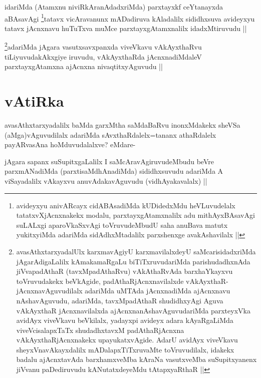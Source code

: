 
\begin{artha}
idariMda (Atamxnu niviRkAranAdadxriMda) parxtayxkf ceYtanayxda aBAsavAgi \footnote{avideyxyu anivARcayx cidABAsadiMda kUDidedxMdu heVLuvudelalx tatatxvXjAcnxnakekx modalu, parxtayxgAtamxnalilx adu mithAyxBAsavAgi suLALxgi aparoVkaSxvAgi toVruvudeMbudU saha anuBava matutx yukitxyiMda adariMda sidAdhxMtadalilx parxshenxge avakAshavilalx ||}tatavx vicAravanunx mADadiruva kAladalilx sididhxsuva avideyxyu tatavx jAcnxnavu huTuTxva muMce parxtayxgAtamxnalilx idadxMtiruvudu ||
\end{artha}


\begin{artha}
\footnote{avasAthxtarxyadalUlx karxmavAgiyU karxmavilalxdeyU saMcarisidadxriMda jAgarAdigaLalilx kAmakamaRgaLu biTiTxruvudariMda parishudadhxnAda jiVvapadAthaR (tavxMpadAthaRvu) vAkAthaRvAda barxhaYkayxvu toVruvudakekx beVkAgide, padAthaRjAcnxnavilalxde vAkAyxthaR- jAcnxnavAguvudilalx adariMda uMTAda jAcnxnadiMda ajAcnxnavu nAshavAguvudu, adariMda, tavxMpadAthaR shudidhxyAgi Aguva vAkAyxthaR jAcnxnavilalxda ajAcnx\-nanAshavAguvudariMda parxteyxVka avidAyx viveVkavu beVkilalx, yadayxpi avideyx adara kAyaRgaLiMda viveVcisalapxTaTx shudadhxtavxM padAthaRjAcnxna vAkAyxthaRjAcnxnakekx upayukatxvAgide. AdarU avidAyx viveVkavu sheyxVnavAkayxdalilx mADalapxTiTxruvaMte toVruvudilalx, idakekx badalu ajAcnxtavAda barxhamxveMba kAraNa vasutxveMba suSupitxyanenx jiVvanu paDediruvudu kANutatxdeyeMdu tAtapxyaRthaR ||}adariMda jAgara vasutxsavxpanxda viveVkavu vAkAyxthaRvu tiLiyuvudakAkxgiye iruvudu, vAkAyxthaRda jAcnxnadiMdaleV parxtayxgAtamxna ajAcnxna nivaqtitxyAguvudu ||
\end{artha}

\section*{vAtiRka}

\begin{artha}
avasAthxtarxyadalilx baMda garxMtha saMdaBaRvu inonxMdakekx sheVSa (aMga)vAguvudilalx adariMda sAvxthaRdalelx=tananx athaRdalelx payARvasAna hoMduvudalalxve? eMdare-
\end{artha}

\begin{artha}
jAgara sapanx suSupitxgaLalilx I saMcAravAgiruvudeMbudu beVre parxmANadiMda (parxtisaMdhAnadiMda) sididhxsuvudu adariMda A viSayadalilx vAkayxvu anuvAdakavAguvudu (vidhAyakavalalx) ||
\end{artha}

